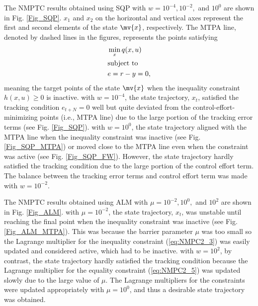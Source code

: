 \documentclass[journal]{IEEEtranTIE}
\begin{document}
The NMPTC results obtained using SQP with $w = 10^{-4}, 10^{-2},$ and $10^{0}$ are shown in Fig. \ref{Fig_SQP}. $x_1$ and $x_2$ on the horizontal and vertical axes represent the first and second elements of the state $\mv{x}$, respectively. The MTPA line, denoted by dashed lines in the figures, represents the points satisfying
\begin{subequations}
\begin{align}
&\mathop {\min }\limits_x q(x,u)\\\nonumber
&{\rm{subject\ to}}\\
&e = r - y = 0,
\end{align}
\end{subequations}
meaning the target points of the state $\mv{x}$ when the inequality constraint $h(x,u) \ge 0$ is inactive. with $w = 10^{-4}$, the state trajectory, $x_t$, satisfied the tracking condition $e_{t+N} = 0$ well but quite deviated from the control-effort-minimizing points (i.e., MTPA line) due to the large portion of the tracking error terms (see Fig. \ref{Fig_SQP}). with $w = 10^{0}$, the state trajectory aligned with the MTPA line when the inequality constraint was inactive (see Fig. \ref{Fig_SQP_MTPA}) or moved close to the MTPA line even when the constraint was active (see Fig. \ref{Fig_SQP_FW}). However, the state trajectory hardly satisfied the tracking condition due to the large portion of the control effort term. The balance between the tracking error terms and control effort term was made with $w = 10^{-2}$.

The NMPTC results obtained using ALM with $\mu = 10^{-2}, 10^{0},$ and $10^{2}$ are shown in Fig. \ref{Fig_ALM}. with $\mu = 10^{-2}$, the state trajectory, $x_t$, was unstable until reaching the final point when the inequality constraint was inactive (see Fig. \ref{Fig_ALM_MTPA}). This was because the barrier parameter $\mu$ was too small so the Lagrange multiplier for the inequality constraint (\ref{eq:NMPC2_3}) was easily updated and considered active, which had to be inactive.
with $w = 10^{2}$, by contrast, the state trajectory hardly satisfied the tracking condition because the Lagrange multiplier for the equality constraint (\ref{eq:NMPC2_5}) was updated slowly due to the large value of $\mu$. The Lagrange multipliers for the constraints were updated appropriately with $\mu = 10^{0}$, and thus a desirable state trajectory was obtained.
\end{document}
